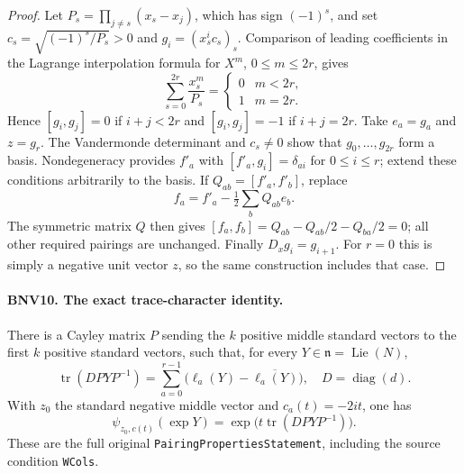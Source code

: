 \begin{proof}
Let $P_s=\prod_{j\ne s}(x_s-x_j)$, which has sign $(-1)^s$, and set
$c_s=\sqrt{(-1)^s/P_s}>0$ and $g_i=(x_s^ic_s)_s$.
Comparison of leading coefficients in the Lagrange interpolation formula
for $X^m$, $0\le m\le2r$, gives
\[
 \sum_{s=0}^{2r}\frac{x_s^m}{P_s}
 =\begin{cases}0&m<2r,\\1&m=2r.\end{cases}
\]
Hence $[g_i,g_j]=0$ if $i+j<2r$ and $[g_i,g_j]=-1$ if $i+j=2r$.
Take $e_a=g_a$ and $z=g_r$.  The Vandermonde determinant and $c_s\ne0$
show that $g_0,\ldots,g_{2r}$ form a basis.  Nondegeneracy provides
$f'_a$ with $[f'_a,g_i]=\delta_{ai}$ for $0\le i\le r$; extend these
conditions arbitrarily to the basis.  If $Q_{ab}=[f'_a,f'_b]$, replace
\[
 f_a=f'_a-\tfrac12\sum_b Q_{ab}e_b.
\]
The symmetric matrix $Q$ then gives $[f_a,f_b]=Q_{ab}-Q_{ab}/2-Q_{ba}/2=0$;
all other required pairings are unchanged.  Finally $D_xg_i=g_{i+1}$.
For $r=0$ this is simply a negative unit vector $z$, so the same
construction includes that case.
\end{proof}

\paragraph{BNV10. The exact trace-character identity.}
\label{claim:BNV10}
There is a Cayley matrix $P$ sending the $k$ positive middle standard
vectors to the first $k$ positive standard vectors, such that, for every
$Y\in\mathfrak n=\operatorname{Lie}(N)$,
\[
 \operatorname{tr}(D PYP^{-1})
 =\sum_{a=0}^{r-1}\bigl(\ell_a(Y)-\overline{\ell_a(Y)}\bigr),
 \quad D=\operatorname{diag}(d).
 \tag{BNV.15}
\]
With $z_0$ the standard negative middle vector and $c_a(t)=-2it$, one has
\[
 \psi_{z_0,c(t)}(\exp Y)
   =\exp\bigl(t\operatorname{tr}(D PYP^{-1})\bigr).
 \tag{BNV.16}
\]
These are the full original \texttt{PairingPropertiesStatement}, including
the source condition \texttt{WCols}.

